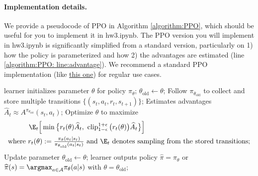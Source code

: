 \paragraph{Implementation details.}
We provide a pseudocode of PPO in Algorithm \ref{algorithm:PPO}, which should be useful for you to implement it in hw3.ipynb.
The PPO version you will implement in hw3.ipynb is significantly simplified from a standard version, particularly on 1) how the policy is parameterized and how 2) the advantages are estimated (line \ref{algorithm:PPO: line:advantage}).
We recommend a standard PPO implementation (like \href{https://github.com/vwxyzjn/cleanrl}{this one}) for regular use cases.
\begin{algorithm}
\caption{Proximal Policy Optimization (PPO) with clipped objective} \label{algorithm:PPO}
\begin{algorithmic}[1]
\State learner initializes parameter $\theta$ for policy $\pi_\theta$;
\State $\theta_{\text{old}}\gets\theta$;
\Repeat
    \State Follow $\pi_{\theta_{\text{old}}}$ to collect and store multiple transitions $\{(s_t,a_t,r_t,s_{t+1})\}$;
    \State Estimates advantages $\widehat{A}_t\approx A^{\pi_{\theta_{\text{old}}}}(s_t,a_t)$;
    \label{algorithm:PPO: line:advantage}
    \State Optimize $\theta$ to maximize
    \begin{align*}
        &\qquad\quad\E_{t}\Big[\min\big\{
    r_t(\theta) \widehat{A}_t,~
    \operatorname{clip}^{1+\epsilon}_{1-\epsilon}\big(r_t(\theta)\big)\widehat{A}_t
    \big\}\Big]\\
    &\text{where $r_t(\theta):= \tfrac{\pi_\theta(a_t|s_t)}{\pi_{\theta_{\text{old}}}(a_t|s_t)}$ and $\E_{t}$ denotes sampling from the stored transitions;}
    \end{align*}
    \State Update parameter $\theta_{\text{old}}\gets\theta$;
\State learner outputs policy $\widehat{\pi} =\pi_\theta$ or $\widehat{\pi}(s) =\argmax_{a\in\mathcal{A}}\pi_\theta(a|s)$ with $\theta = \theta_{\text{old}}$;
\label{algorithm:RL interaction:line:final policy}
\end{algorithmic}
\end{algorithm}



